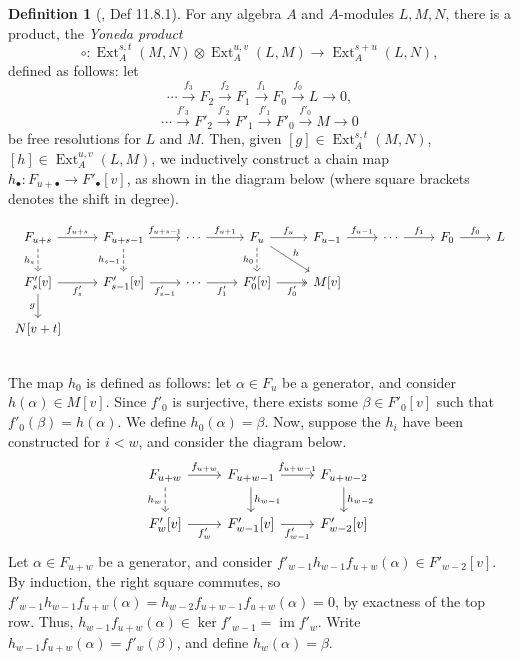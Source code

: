 \documentclass[11pt, titlepage]{article} %
\DeclareMathOperator{\Ext}{Ext}
\DeclareMathOperator{\im}{im}
\numberwithin{equation}{subsection}
\theoremstyle{plain}
\theoremstyle{definition}
\newtheorem{definition}[theorem]{Definition}
\begin{document}
\begin{definition}[\autocite{rognes2}, Def 11.8.1]
For any algebra \(A\) and \(A\)-modules \(L,M,N\), there is a product, the \textit{Yoneda product}
\[\circ : \Ext_A^{s,t}(M,N)\otimes \Ext^{u,v}_A(L,M)\to \Ext_A^{s+u}(L,N),\]
defined as follows: let 
\[\cdots \xrightarrow{f_3} F_2 \xrightarrow{f_2} F_1 \xrightarrow{f_1} F_0 \xrightarrow{f_0} L\to 0,\]
\[\cdots \xrightarrow{f'_3} F'_2 \xrightarrow{f'_2} F'_1 \xrightarrow{f'_1} F'_0 \xrightarrow{f'_0} M\to 0\]
be free resolutions for \(L\) and \(M\). Then, given \([g] \in \Ext_A^{s,t}(M, N)\), \([h]\in \Ext_A^{u,v}(L, M)\), we inductively construct a chain map \(h_\bullet : F_{u+\bullet} \to F'_{\bullet}[v]\), as shown in the diagram below (where square brackets denotes the shift in  degree).

\[\begin{tikzcd} 
F_{u+s} \arrow[r, "f_{u+s}"] \arrow[d, swap, "h_s", dashrightarrow]  & F_{u+s-1} \arrow[r, "f_{u+s-1}"] \arrow[d, "h_{s-1}"', dashrightarrow] & \cdots \arrow[r, "f_{u+1}"] & F_u \arrow[d, "h_0"', dashrightarrow] \arrow[dr, "h"] \arrow[r, "f_u"] & F_{u-1} \arrow[r, "f_{u-1}"] & \cdots \arrow[r, "f_1"] & F_0 \arrow[r, "f_0"] & L \\ 
F'_{s}[v] \arrow[r, swap, "f'_s"] \arrow[d, swap, "g"] & F'_{s-1}[v] \arrow[r, "f'_{s-1}"'] & \cdots \arrow[r, "f'_1"'] & F'_0[v] \arrow[r, "f'_0"', twoheadrightarrow] & M[v] & & & \\ 
N[v+t] & & & & & & & \\ 
\end{tikzcd}\]
The map \(h_0\) is defined as follows: let \(\alpha \in F_u\) be a generator, and consider \(h(\alpha)\in M[v]\). Since \(f'_0\) is surjective, there exists some \(\beta\in F'_0[v]\) such that \(f'_0(\beta)=h(\alpha)\). We define \(h_0(\alpha)=\beta\). Now, suppose the \(h_i\) have been constructed for \(i<w\), and consider the diagram below.
\[\begin{tikzcd}
F_{u+w} \arrow[r, "f_{u+w}"] \arrow[d, swap, "h_w", dashrightarrow]  & F_{u+w-1} \arrow[r, "f_{u+w-1}"] \arrow[d, "h_{w-1}"] & F_{u+w-2} \arrow[d, "h_{w-2}"] \\ 
F'_w[v] \arrow[r, swap, "f'_w"]  & F'_{w-1}[v] \arrow[r, "f'_{w-1}"'] & F'_{w-2}[v] 
 \end{tikzcd}\] 
Let \(\alpha\in F_{u+w}\) be a generator, and consider \(f'_{w-1}h_{w-1}f_{u+w}(\alpha)\in F'_{w-2}[v]\). By induction, the right square commutes, so \(f'_{w-1}h_{w-1}f_{u+w}(\alpha)=h_{w-2}f_{u+w-1}f_{u+w}(\alpha)=0\), by exactness of the top row. Thus, \(h_{w-1}f_{u+w}(\alpha)\in \ker f'_{w-1}=\im f'_w\). Write \(h_{w-1}f_{u+w}(\alpha)=f'_w(\beta)\), and define \(h_w(\alpha)=\beta\).  


\end{definition}
\end{document}
